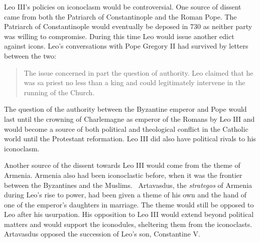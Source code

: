 \documentclass[12pt]{article}
\begin{document}
    Leo III's policies on iconoclasm would be controversial. One source of dissent came from both the Patriarch of Constantinople and the Roman Pope. The Patriarch of Constantinople would eventually be deposed in 730 as neither party was willing to compromise. During this time Leo would issue another edict against icons. Leo's conversations with Pope Gregory II had survived by letters between the two: \begin{quote}
        The issue concerned in part the question of authority. Leo claimed that he was sa priest no less than a king and could legitimately intervene in the running of the Church.~\cite[p. 52]{LeoJour}
    \end{quote}\noindent
    The question of the authority between the Byzantine emperor and Pope would last until the crowning of Charlemagne as emperor of the Romans by Leo III and would become a source of both political and theological conflict in the Catholic world until the Protestant reformation. Leo III did also have political rivals to his iconoclasm.

    Another source of the dissent towards Leo III would come from the theme of Armenia. Armenia also had been iconoclastic before, when it was the frontier between the Byzantines and the Muslims.~\cite[p. 58]{LeoJour} Artavasdus, the \emph{strategos} of Armenia during Leo's rise to power, had been given a theme of his own and the hand of one of the emperor's daughters in marriage. The theme would still be opposed to Leo after his usurpation. His opposition to Leo III would extend beyond political matters and would support the iconodules, sheltering them from the iconoclasts. Artavasdus opposed the succession of Leo's son, Constantine V. \
\end{document}
